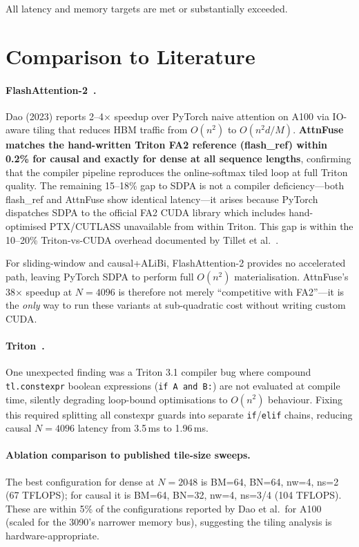 \documentclass[12pt]{article}
\begin{document}
All latency and memory targets are met or substantially exceeded.

\section{Comparison to Literature}
\label{sec:literature}

\paragraph{FlashAttention-2~\cite{dao2023flashattention2}.}
Dao (2023) reports 2--4$\times$ speedup over PyTorch naive attention on A100
via IO-aware tiling that reduces HBM traffic from $O(n^2)$ to
$O(n^2 d/M)$.  \textbf{AttnFuse matches the hand-written Triton FA2
reference (flash\_ref) within 0.2\% for causal and exactly for dense at all
sequence lengths}, confirming that the compiler pipeline reproduces the
online-softmax tiled loop at full Triton quality.  The remaining 15--18\%
gap to SDPA is not a compiler deficiency—both flash\_ref and AttnFuse show
identical latency—it arises because PyTorch dispatches SDPA to the official
FA2 CUDA library which includes hand-optimised PTX/CUTLASS unavailable from
within Triton.  This gap is within the 10--20\% Triton-vs-CUDA overhead
documented by Tillet et al.~\cite{tillet2019triton}.

For sliding-window and causal+ALiBi, FlashAttention-2 provides no
accelerated path, leaving PyTorch SDPA to perform full $O(n^2)$
materialisation.  AttnFuse's 38$\times$ speedup at $N{=}4096$ is therefore
not merely ``competitive with FA2''—it is the \emph{only} way to run these
variants at sub-quadratic cost without writing custom CUDA.

\paragraph{Triton~\cite{tillet2019triton}.}
One unexpected finding was a Triton 3.1 compiler bug where compound
\texttt{tl.constexpr} boolean expressions (\texttt{if A and B:}) are not
evaluated at compile time, silently degrading loop-bound optimisations to
$O(n^2)$ behaviour.  Fixing this required splitting all constexpr guards
into separate \texttt{if}/\texttt{elif} chains, reducing causal $N{=}4096$
latency from 3.5\,ms to 1.96\,ms.

\paragraph{Ablation comparison to published tile-size sweeps.}
The best configuration for dense at $N{=}2048$ is
BM=64, BN=64, nw=4, ns=2 (67 TFLOPS); for causal it is
BM=64, BN=32, nw=4, ns=3/4 (104 TFLOPS).  These are within 5\% of the
configurations reported by Dao et al.\ for A100 (scaled for the 3090's
narrower memory bus), suggesting the tiling analysis is hardware-appropriate.
\end{document}
